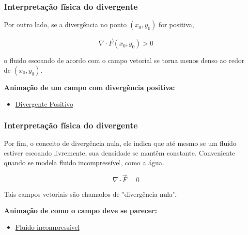 \begin{frame}
    \frametitle{Interpretação física do divergente}
    Por outro lado, se a divergência no ponto $(x_0,y_0)$ for positiva,
    \vspace{2mm}
    
    \begin{equation*}
        \nabla \cdot \vec{F}(x_0,y_0) > 0
    \end{equation*}
    \vspace{2mm}
    
    o fluido escoando de acordo com o campo vetorial se torna menos denso ao redor de $(x_0,y_0)$.
    \vspace{5mm}
    
    \textbf{Animação de um campo com divergência positiva:}
    \begin{itemize}
        \item \href{https://www.youtube.com/watch?v=_mwMoEwwkvc}{Divergente Positivo}
    \end{itemize}
    
\end{frame}

\begin{frame}
    \frametitle{Interpretação física do divergente}
    Por fim, o conceito de divergência nula, ele indica que até mesmo se um fluido estiver escoando livremente, sua densidade se mantêm constante. Conveniente quando se modela fluido incompressível, como a água.
    \vspace{2mm}
    
    \begin{equation*}
        \nabla \cdot \vec{F} = 0
    \end{equation*}
    \vspace{2mm}
    
    Tais campos vetoriais são chamados de "divergência nula".
    \vspace{5mm}
    
    \textbf{Animação de como o campo deve se parecer:}
    \begin{itemize}
        \item \href{https://www.youtube.com/watch?v=TC9MP-y1s_c}{Fluido incompressível}
    \end{itemize}
    
\end{frame}

